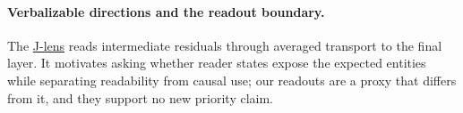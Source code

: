 \paragraph{Verbalizable directions and the readout boundary.}
The \href{https://transformer-circuits.pub/2026/workspace/index.html}{J-lens} reads intermediate residuals through averaged transport to the final layer.
It motivates asking whether reader states expose the expected entities while separating readability from causal use; our readouts are a proxy that differs from it, and they support no new priority claim.  %
